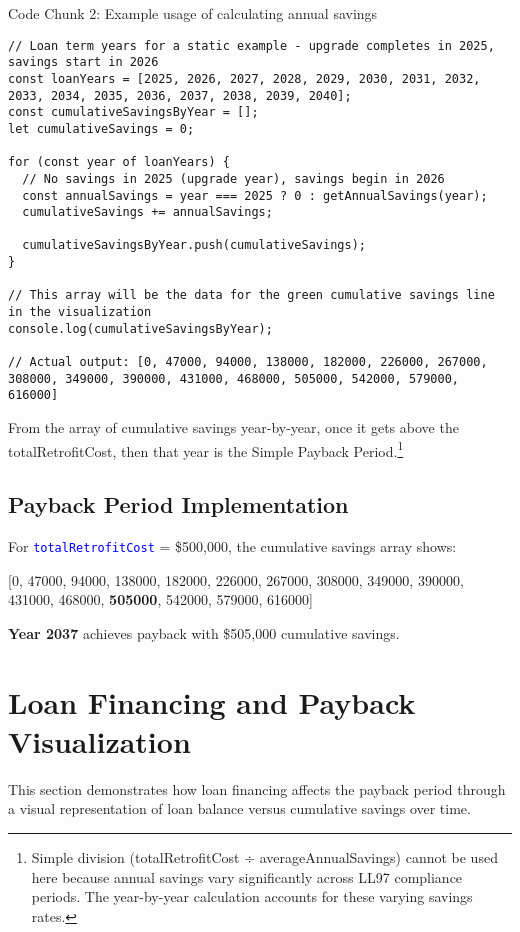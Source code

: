 \documentclass{article}
\newcommand{\code}[1]{\textcolor{blue}{\texttt{#1}}}
\begin{document}
Code Chunk 2: Example usage of calculating annual savings
\begin{lstlisting}
// Loan term years for a static example - upgrade completes in 2025, savings start in 2026
const loanYears = [2025, 2026, 2027, 2028, 2029, 2030, 2031, 2032, 2033, 2034, 2035, 2036, 2037, 2038, 2039, 2040];
const cumulativeSavingsByYear = [];
let cumulativeSavings = 0;

for (const year of loanYears) {
  // No savings in 2025 (upgrade year), savings begin in 2026
  const annualSavings = year === 2025 ? 0 : getAnnualSavings(year);
  cumulativeSavings += annualSavings;
  
  cumulativeSavingsByYear.push(cumulativeSavings);
}

// This array will be the data for the green cumulative savings line in the visualization
console.log(cumulativeSavingsByYear);

// Actual output: [0, 47000, 94000, 138000, 182000, 226000, 267000, 308000, 349000, 390000, 431000, 468000, 505000, 542000, 579000, 616000]
\end{lstlisting}

From the array of cumulative savings year-by-year, once it gets above the totalRetrofitCost, then that year is the Simple Payback Period.\footnote{Simple division (totalRetrofitCost ÷ averageAnnualSavings) cannot be used here because annual savings vary significantly across LL97 compliance periods. The year-by-year calculation accounts for these varying savings rates.}

\subsection{Payback Period Implementation}

For \code{totalRetrofitCost} = \$500,000, the cumulative savings array shows:

[0, 47000, 94000, 138000, 182000, 226000, 267000, 308000, 349000, 390000, 431000, 468000, \textbf{505000}, 542000, 579000, 616000]

\textbf{Year 2037} achieves payback with \$505,000 cumulative savings.

\section{Loan Financing and Payback Visualization}

This section demonstrates how loan financing affects the payback period through a visual representation of loan balance versus cumulative savings over time.
\end{document}
